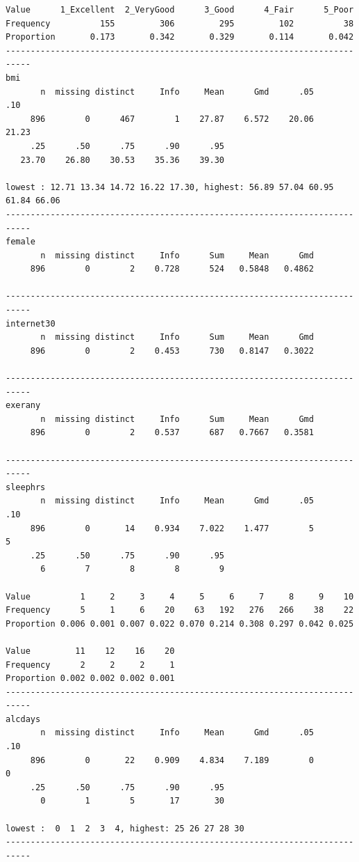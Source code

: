 \documentclass[]{book}
\theoremstyle{definition}
\theoremstyle{definition}
\theoremstyle{definition}
\theoremstyle{remark}
\begin{document}
\begin{verbatim}
Value      1_Excellent  2_VeryGood      3_Good      4_Fair      5_Poor
Frequency          155         306         295         102          38
Proportion       0.173       0.342       0.329       0.114       0.042
---------------------------------------------------------------------------
bmi 
       n  missing distinct     Info     Mean      Gmd      .05      .10 
     896        0      467        1    27.87    6.572    20.06    21.23 
     .25      .50      .75      .90      .95 
   23.70    26.80    30.53    35.36    39.30 

lowest : 12.71 13.34 14.72 16.22 17.30, highest: 56.89 57.04 60.95 61.84 66.06
---------------------------------------------------------------------------
female 
       n  missing distinct     Info      Sum     Mean      Gmd 
     896        0        2    0.728      524   0.5848   0.4862 

---------------------------------------------------------------------------
internet30 
       n  missing distinct     Info      Sum     Mean      Gmd 
     896        0        2    0.453      730   0.8147   0.3022 

---------------------------------------------------------------------------
exerany 
       n  missing distinct     Info      Sum     Mean      Gmd 
     896        0        2    0.537      687   0.7667   0.3581 

---------------------------------------------------------------------------
sleephrs 
       n  missing distinct     Info     Mean      Gmd      .05      .10 
     896        0       14    0.934    7.022    1.477        5        5 
     .25      .50      .75      .90      .95 
       6        7        8        8        9 
                                                                      
Value          1     2     3     4     5     6     7     8     9    10
Frequency      5     1     6    20    63   192   276   266    38    22
Proportion 0.006 0.001 0.007 0.022 0.070 0.214 0.308 0.297 0.042 0.025
                                  
Value         11    12    16    20
Frequency      2     2     2     1
Proportion 0.002 0.002 0.002 0.001
---------------------------------------------------------------------------
alcdays 
       n  missing distinct     Info     Mean      Gmd      .05      .10 
     896        0       22    0.909    4.834    7.189        0        0 
     .25      .50      .75      .90      .95 
       0        1        5       17       30 

lowest :  0  1  2  3  4, highest: 25 26 27 28 30
---------------------------------------------------------------------------
\end{verbatim}
\end{document}
